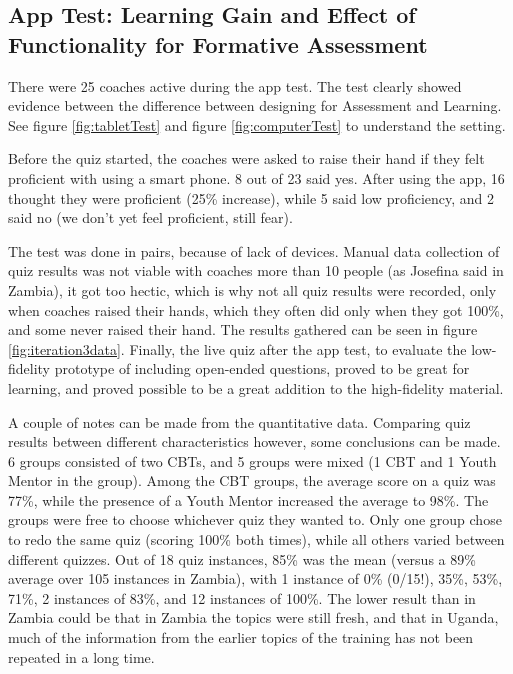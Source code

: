 
    \subsection{App Test: Learning Gain and Effect of Functionality for Formative Assessment}
  There were 25 coaches active during the app test. The test clearly showed evidence between the difference between designing for Assessment and Learning. See figure \ref{fig:tabletTest} and figure \ref{fig:computerTest} to understand the setting.

  Before the quiz started, the coaches were asked to raise their hand if they felt proficient with using a smart phone. 8 out of 23 said yes. After using the app, 16 thought they were proficient (25\% increase), while 5 said low proficiency, and 2 said no (we don't yet feel proficient, still fear).

  The test was done in pairs, because of lack of devices. Manual data collection of quiz results was not viable with coaches more than 10 people (as Josefina said in Zambia), it got too hectic, which is why not all quiz results were recorded, only when coaches raised their hands, which they often did only when they got 100\%, and some never raised their hand. The results gathered can be seen in figure \ref{fig:iteration3data}. Finally, the live quiz after the app test, to evaluate the low-fidelity prototype of including open-ended questions, proved to be great for learning, and proved possible to be a great addition to the high-fidelity material.

  A couple of notes can be made from the quantitative data. Comparing quiz results between different characteristics however, some conclusions can be made. 6 groups consisted of two CBTs, and 5 groups were mixed (1 CBT and 1 Youth Mentor in the group). Among the CBT groups, the average score on a quiz was 77\%, while the presence of a Youth Mentor increased the average to 98\%. The groups were free to choose whichever quiz they wanted to. Only one group chose to redo the same quiz (scoring 100\% both times), while all others varied between different quizzes. Out of 18 quiz instances, 85\% was the mean (versus a 89\% average over 105 instances in Zambia), with 1 instance of 0\% (0/15!), 35\%, 53\%, 71\%, 2 instances of 83\%, and 12 instances of 100\%. The lower result than in Zambia could be that in Zambia the topics were still fresh, and that in Uganda, much of the information from the earlier topics of the training has not been repeated in a long time.

